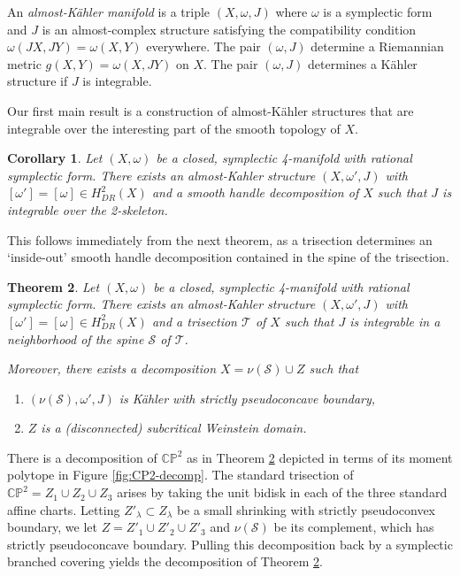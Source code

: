\documentclass[11pt]{amsart}
\newtheorem{theorem}{Theorem}[section]
\newtheorem{corollary}[theorem]{Corollary}
\theoremstyle{definition}
\theoremstyle{remark}
\numberwithin{equation}{section}
\newcommand{\cT}{\mathcal{T}}
\newcommand{\cS}{\mathcal{S}}
\newcommand{\CP}{\mathbb{CP}}
\begin{document}
An {\it almost-K\"ahler manifold} is a triple $(X,\omega,J)$ where $\omega$ is a symplectic form and $J$ is an almost-complex structure satisfying the compatibility condition $\omega(JX,JY) = \omega(X,Y)$ everywhere.  The pair $(\omega,J)$ determine a Riemannian metric $g(X,Y) = \omega(X,JY)$ on $X$.  The pair $(\omega,J)$ determines a K\"ahler structure if $J$ is integrable.

Our first main result is a construction of almost-K\"ahler structures that are integrable over the interesting part of the smooth topology of $X$.

\begin{corollary}
\label{cor:2-skeleton}
Let $(X,\omega)$ be a closed, symplectic 4-manifold with rational symplectic form.  There exists an almost-Kahler structure $(X,\omega',J)$ with $[\omega'] = [\omega] \in H^2_{DR}(X)$ and a smooth handle decomposition of $X$ such that $J$ is integrable over the 2-skeleton.
\end{corollary}

This follows immediately from the next theorem, as a trisection determines an `inside-out' smooth handle decomposition contained in the spine of the trisection.

\begin{theorem}
\label{thrm:main-kahler}
    Let $(X,\omega)$ be a closed, symplectic 4-manifold with rational symplectic form.  There exists an almost-Kahler structure $(X,\omega',J)$ with $[\omega'] = [\omega] \in H^2_{DR}(X)$ and a trisection $\cT$ of $X$ such that $J$ is integrable in a neighborhood of the spine $\cS$ of $\cT$.

    Moreover, there exists a decomposition $X = \nu(\cS) \cup Z$ such that
    \begin{enumerate}
        \item $(\nu(\cS),\omega',J)$ is K\"ahler with strictly pseudoconcave boundary,
        \item $Z$ is a (disconnected) subcritical Weinstein domain.
    \end{enumerate}
\end{theorem}

There is a decomposition of $\CP^2$ as in Theorem \ref{thrm:main-kahler} depicted in terms of its moment polytope in Figure \ref{fig:CP2-decomp}.  The standard trisection of $\CP^2 = Z_1 \cup Z_2 \cup Z_3$ arises by taking the unit bidisk in each of the three standard affine charts.  Letting $Z'_{\lambda} \subset Z_{\lambda}$ be a small shrinking with strictly pseudoconvex boundary, we let $Z = Z'_1 \cup Z'_2 \cup Z'_3$ and $\nu(\cS)$ be its complement, which has strictly pseudoconcave boundary.  Pulling this decomposition back by a symplectic branched covering yields the decomposition of Theorem \ref{thrm:main-kahler}.
\end{document}

